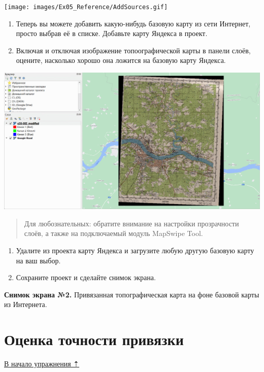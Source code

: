 \documentclass[
  12pt,
]{book}
\begin{document}
\texttt{[image: images/Ex05\_Reference/AddSources.gif]}

\begin{enumerate}
\def\labelenumi{\arabic{enumi}.}
\setcounter{enumi}{4}
\item
  Теперь вы можете добавить какую-нибудь базовую карту из сети Интернет, просто выбрав её в списке. Добавьте карту Яндекса в проект.
\item
  Включая и отключая изображение топоографической карты в панели слоёв, оцените, насколько хорошо она ложится на базовую карту Яндекса.
\end{enumerate}

\includegraphics{images/Ex05_Reference/Overlay.gif}

\begin{quote}
Для любознательных: обратите внимание на настройки прозрачности слоёв, а также на подключаемый модуль MapSwipe Tool.
\end{quote}

\begin{enumerate}
\def\labelenumi{\arabic{enumi}.}
\setcounter{enumi}{6}
\item
  Удалите из проекта карту Яндекса и загрузите любую другую базовую карту на ваш выбор.
\item
  Сохраните проект и сделайте снимок экрана.
\end{enumerate}

\textbf{Снимок экрана №2.} Привязанная топографическая карта на фоне базовой карты из Интернета.

\hypertarget{raster-reference-accuracy}{%
\section{Оценка точности привязки}\label{raster-reference-accuracy}}

\protect\hyperlink{raster-reference}{В начало упражнения ⇡}
\end{document}

